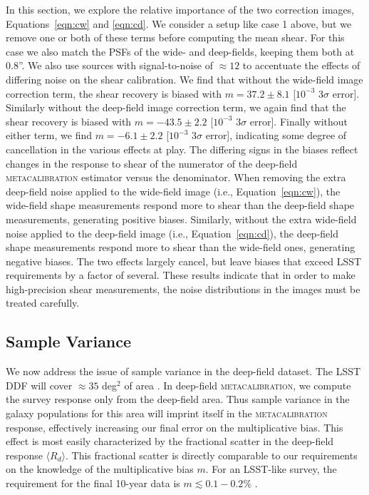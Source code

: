 \documentclass[twocolumn]{openjournal}
\makeatletter
\newcommand{\mcal}{\textsc{metacalibration}\@\xspace}
\makeatother
\begin{document}
In this section, we explore the relative importance of the two correction images,
Equations~\ref{eqn:cw} and \ref{eqn:cd}. We consider a setup like case 1 above, but we
remove one or both of these terms before computing the mean shear. For this case we also
match the PSFs of the wide- and deep-fields, keeping them both at 0.8''. We also use
sources with signal-to-noise of $\approx12$ to accentuate the effects of differing noise
on the shear calibration. We find that without the wide-field image correction term, the
shear recovery is biased with $m=37.2\pm8.1$ [$10^{-3}$ $3\sigma$ error]. Similarly
without the deep-field image correction term, we again find that the shear recovery is biased
with $m=-43.5\pm2.2$ [$10^{-3}$ $3\sigma$ error]. Finally without either term, we find
$m=-6.1\pm2.2$ [$10^{-3}$ $3\sigma$ error], indicating some degree of cancellation in
the various effects at play. The differing signs in the biases reflect changes in the
response to shear of the numerator of the deep-field \mcal estimator versus the
denominator. When removing the extra deep-field noise applied to the wide-field image
(i.e., Equation~\ref{eqn:cw}), the wide-field shape measurements respond more to shear
than the deep-field shape measurements, generating positive biases. Similarly, without
the extra wide-field noise applied to the deep-field image (i.e.,
Equation~\ref{eqn:cd}), the deep-field shape measurements respond more to shear than the
wide-field ones, generating negative biases. The two effects largely cancel, but leave
biases that exceed LSST requirements by a factor of several. These results indicate that
in order to make high-precision shear measurements, the noise distributions in the
images must be treated carefully.



\subsection{Sample Variance}\label{sec:sv}

We now address the issue of sample variance in the deep-field dataset. The LSST DDF will
cover $\approx35$ deg$^2$ of area \citep{lsst-ddf-design,ivezic2019lsst}. In deep-field
\mcal, we compute the survey response only from the deep-field area. Thus sample
variance in the galaxy populations for this area will imprint itself in the \mcal
response, effectively increasing our final error on the multiplicative bias. This effect
is most easily characterized by the fractional scatter in the deep-field response
$\langle R_{d}\rangle$. This fractional scatter is directly comparable to our
requirements on the knowledge of the multiplicative bias $m$. For an LSST-like survey,
the requirement for the final 10-year data is $m \lesssim 0.1-0.2\%$
\citep{huterer2006,descsrd}.
\end{document}
